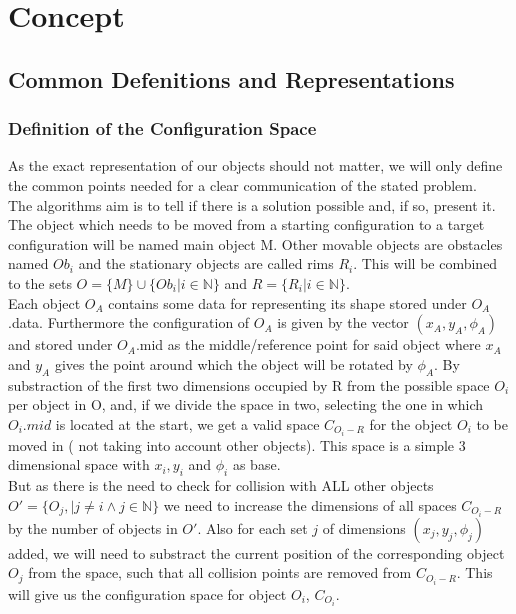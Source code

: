 \chapter{Concept}
\section{Common Defenitions and Representations}
\subsection{Definition of the Configuration Space}
As the exact representation of our objects should not matter, we will only define the common points needed for a clear communication of the stated problem.\\
The algorithms aim is to tell if there is a solution possible and, if so, present it. The object which needs to be moved from a starting configuration to a target configuration will be named main object M. Other movable objects are obstacles named $Ob_i$  and the stationary objects are called rims $R_i$. This will be combined to the sets $O = \{M\}  \cup \{Ob_i | i \in \mathbb{N} \} $ and $ R = \{ R_i | i \in \mathbb{N}\}$.\\

Each object $O_A$ contains some data for representing its shape stored under $O_A$.data. Furthermore the configuration of $O_A$ is given by the vector $(x_A,y_A,\phi_A)$ and stored under $O_A$.mid as the middle/reference point for said object where $x_A$ and $y_A$ gives the point around which the object will be rotated by $\phi_A$.
By substraction of the first two dimensions occupied by R from the possible space $O_i$ per object in O, and, if we divide the space in two, selecting the one in which $O_i.mid$ is located at the start, we get a valid space $C_{O_i-R}$ for the object $O_i$ to be moved in ( not taking into account other objects). This space is a simple 3 dimensional space with $x_i, y_i$ and $\phi_i$ as base.\\
But as there is the need to check for collision with ALL other objects $O' = \{O_j, | j\neq i \wedge j \in \mathbb{N}\} $ we need to increase the dimensions of all spaces $C_{O_i-R}$ by the number of objects in $O'$. Also for each set $j$ of dimensions $(x_j,y_j,\phi_j)$  added, we will need to substract the current position of the corresponding object $O_j$ from the space, such that all collision points are removed from $C_{O_i-R}$. This will give us the configuration space for object $O_i$, $C_{O_i}$.


